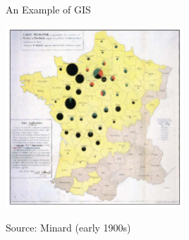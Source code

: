 \documentclass[show notes, aspectratio=1610]{beamer}
\begin{document}
\begin{frame}{An Example of GIS}{}
	\centering

	\includegraphics[width=0.5\textwidth]{images/example_of_gis.png}

	\small

	Source: Minard (early 1900s)
\end{frame}
\end{document}
